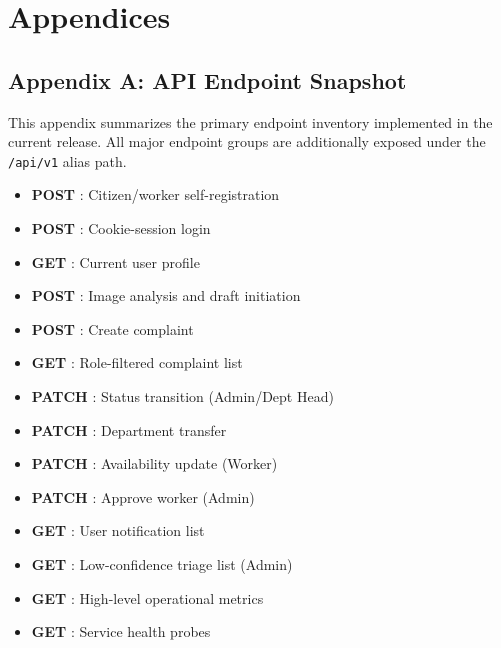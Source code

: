 \chapter{Appendices}

\section{Appendix A: API Endpoint Snapshot}

This appendix summarizes the primary endpoint inventory implemented in the current release. All major endpoint groups are additionally exposed under the \texttt{/api/v1} alias path.

\small
\begin{itemize}[leftmargin=1.5em, noitemsep]
    \item \textbf{POST} : Citizen/worker self-registration
    \item \textbf{POST} : Cookie-session login
    \item \textbf{GET} : Current user profile
    \item \textbf{POST} : Image analysis and draft initiation
    \item \textbf{POST} : Create complaint
    \item \textbf{GET} : Role-filtered complaint list
    \item \textbf{PATCH} : Status transition (Admin/Dept Head)
    \item \textbf{PATCH} : Department transfer
    \item \textbf{PATCH} : Availability update (Worker)
    \item \textbf{PATCH} : Approve worker (Admin)
    \item \textbf{GET} : User notification list
    \item \textbf{GET} : Low-confidence triage list (Admin)
    \item \textbf{GET} : High-level operational metrics
    \item \textbf{GET} : Service health probes
\end{itemize}
\normalsize

